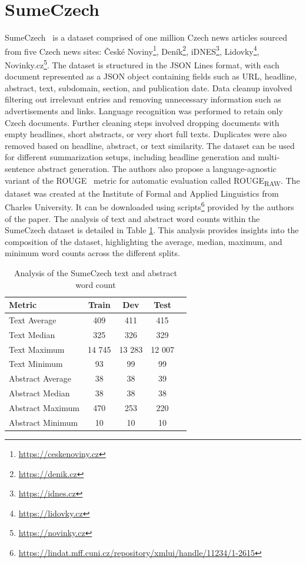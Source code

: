 \documentclass[english, ba, kiv, he, iso690numb, pdf, viewonly]{fasthesis}
\begin{document}
\section{SumeCzech} \label{sumeczech-section}
SumeCzech~\cite{straka-etal-2018-sumeczech} is a dataset comprised of one million Czech news articles sourced from five Czech news sites: České Noviny\footnote{\url{https://ceskenoviny.cz}}, Deník\footnote{\url{https://denik.cz}}, iDNES\footnote{\url{https://idnes.cz}}, Lidovky\footnote{\url{https://lidovky.cz}}, Novinky.cz\footnote{\url{https://novinky.cz}}. The dataset is structured in the JSON Lines format, with each document represented as a JSON object containing fields such as URL, headline, abstract, text, subdomain, section, and publication date. Data cleanup involved filtering out irrelevant entries and removing unnecessary information such as advertisements and links. Language recognition was performed to retain only Czech documents. Further cleaning steps involved dropping documents with empty headlines, short abstracts, or very short full texts. Duplicates were also removed based on headline, abstract, or text similarity. The dataset can be used for different summarization setups, including headline generation and multi-sentence abstract generation. The authors also propose a language-agnostic variant of the ROUGE~\cite{lin-2004-rouge} metric for automatic evaluation called ROUGE\textsubscript{RAW}. The dataset was created at the Institute of Formal and Applied Linguistics from Charles University. It can be downloaded using scripts\footnote{\url{https://lindat.mff.cuni.cz/repository/xmlui/handle/11234/1-2615}} provided by the authors of the paper. The analysis of text and abstract word counts within the SumeCzech dataset is detailed in Table \ref{tab:text_word_count_metrics}. This analysis provides insights into the composition of the dataset, highlighting the average, median, maximum, and minimum word counts across the different splits.

\begin{table}[htbp]
    \centering
    \caption{Analysis of the SumeCzech text and abstract word count}
    \label{tab:text_word_count_metrics}
    \begin{tabular}{lcccc}
        \toprule
        \textbf{Metric} & {\textbf{Train}} & {\textbf{Dev}} & {\textbf{Test}} \\
        \midrule
        Text Average & 409 & 411 & 415 \\
        Text Median & 325 & 326 & 329 \\
        Text Maximum & 14 745 & 13 283 & 12 007 \\
        Text Minimum & 93 & 99 & 99 \\
        \midrule
        Abstract Average & 38 & 38 & 39 \\
        Abstract Median & 38 & 38 & 38 \\
        Abstract Maximum & 470 & 253 & 220 \\
        Abstract Minimum & 10 & 10 & 10 \\
        \bottomrule
    \end{tabular}
\end{table}
\end{document}
